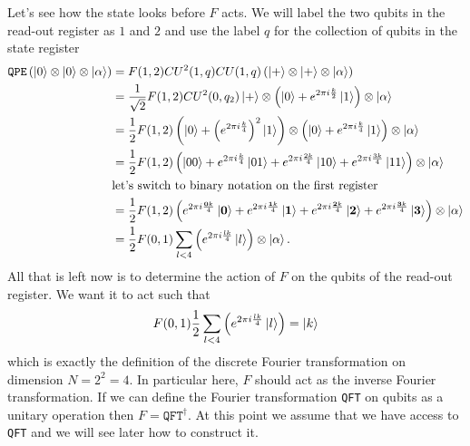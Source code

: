 Let's see how the state looks before $F$ acts. We will label the two qubits in the read-out register as $1$ and $2$ and use the label $q$ for the collection of qubits in the state register
\begin{align}
    \texttt{QPE}\left(\ket{0}\otimes\ket
    {0}\otimes\ket{\alpha}\right) &= F(1,2) CU^2(1,q) CU(1,q) \left(\ket{+}\otimes\ket{+} \otimes \ket{\alpha}\right)\nonumber \\
    & = \frac{1}{\sqrt{2}}F(1,2) CU^2(0,q_2) \ket{+}\otimes\left( \ket{0} + e^{2\pi i \frac{k}{2} }\ket{1}\right) \otimes \ket{\alpha} \nonumber\\
    & = \frac{1}{2}F(1,2) \left( \ket{0} + \left(e^{2\pi i \frac{k}{4} }\right)^2\ket{1}\right) \otimes\left( \ket{0} + e^{2\pi i \frac{k}{4} }\ket{1}\right) \otimes \ket{\alpha} \nonumber\\
    & = \frac{1}{2} F(1,2) \left( \ket{00} +  e^{2\pi i \frac{k}{4} }\ket{01} + e^{2\pi i \frac{2k}{4} }\ket{10} + e^{2\pi i \frac{3k}{4} }\ket{11} \right) \otimes \ket{\alpha}\nonumber \\
    & \text{let's switch to binary notation on the first register}\nonumber\\
    & = \frac{1}{2} F(1,2) \left( e^{2\pi i \frac{\mathbf{0}k}{4}}\ket{\mathbf{0}} +  e^{2\pi i \frac{\mathbf{1}k}{4} }\ket{\mathbf{1}} + e^{2\pi i \frac{\mathbf{2}k}{4} }\ket{\mathbf{2}} + e^{2\pi i \frac{\mathbf{3}k}{4} }\ket{\mathbf{3}} \right) \otimes \ket{\alpha} \nonumber\\
    & = \frac{1}{2} F(0,1) \sum_{l<4}\left( e^{2\pi i \frac{lk}{4}} \ket{l} \right)\otimes\ket{\alpha}.
\end{align}
All that is left now is to determine the action of $F$ on the qubits of the read-out register. We want it to act such that
\begin{align}
     F(0,1)  \frac{1}{2}\sum_{l<4}\left( e^{2\pi i \frac{lk}{4}} \ket{l}\right) = \ket{k}
\end{align}
which is exactly the definition of the discrete Fourier transformation on dimension $N=2^2=4$. In particular here, $F$ should act as the inverse Fourier transformation. If we can define the Fourier transformation \texttt{QFT} on qubits as a unitary operation then $F = \texttt{QFT}^\dagger$. At this point we assume that we have access to \texttt{QFT} and we will see later how to construct it.

